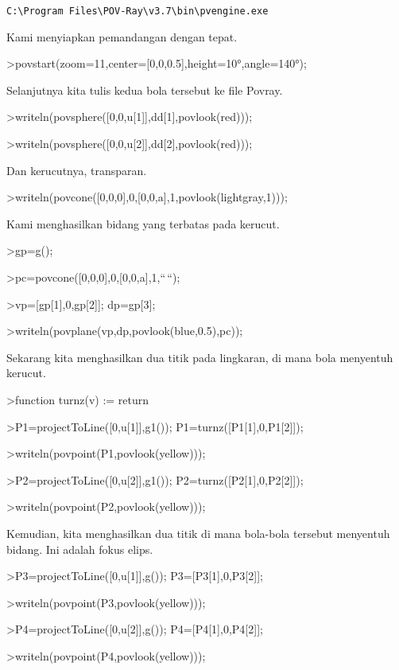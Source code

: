 \documentclass[
]{book}
\begin{document}
\begin{verbatim}
C:\Program Files\POV-Ray\v3.7\bin\pvengine.exe
\end{verbatim}

Kami menyiapkan pemandangan dengan tepat.

\textgreater povstart(zoom=11,center={[}0,0,0.5{]},height=10°,angle=140°);

Selanjutnya kita tulis kedua bola tersebut ke file Povray.

\textgreater writeln(povsphere({[}0,0,u{[}1{]}{]},dd{[}1{]},povlook(red)));

\textgreater writeln(povsphere({[}0,0,u{[}2{]}{]},dd{[}2{]},povlook(red)));

Dan kerucutnya, transparan.

\textgreater writeln(povcone({[}0,0,0{]},0,{[}0,0,a{]},1,povlook(lightgray,1)));

Kami menghasilkan bidang yang terbatas pada kerucut.

\textgreater gp=g();

\textgreater pc=povcone({[}0,0,0{]},0,{[}0,0,a{]},1,``\,``);

\textgreater vp={[}gp{[}1{]},0,gp{[}2{]}{]}; dp=gp{[}3{]};

\textgreater writeln(povplane(vp,dp,povlook(blue,0.5),pc));

Sekarang kita menghasilkan dua titik pada lingkaran, di mana bola menyentuh kerucut.

\textgreater function turnz(v) := return

\textgreater P1=projectToLine({[}0,u{[}1{]}{]},g1()); P1=turnz({[}P1{[}1{]},0,P1{[}2{]}{]});

\textgreater writeln(povpoint(P1,povlook(yellow)));

\textgreater P2=projectToLine({[}0,u{[}2{]}{]},g1()); P2=turnz({[}P2{[}1{]},0,P2{[}2{]}{]});

\textgreater writeln(povpoint(P2,povlook(yellow)));

Kemudian, kita menghasilkan dua titik di mana bola-bola tersebut menyentuh bidang. Ini adalah fokus elips.

\textgreater P3=projectToLine({[}0,u{[}1{]}{]},g()); P3={[}P3{[}1{]},0,P3{[}2{]}{]};

\textgreater writeln(povpoint(P3,povlook(yellow)));

\textgreater P4=projectToLine({[}0,u{[}2{]}{]},g()); P4={[}P4{[}1{]},0,P4{[}2{]}{]};

\textgreater writeln(povpoint(P4,povlook(yellow)));
\end{document}
